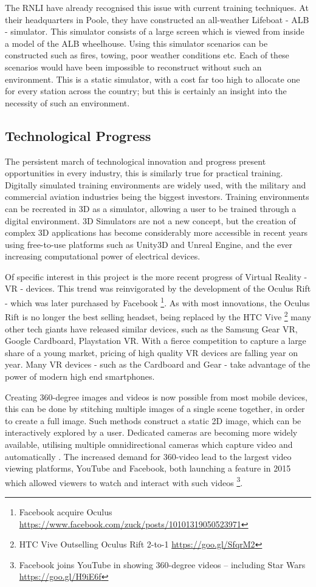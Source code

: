 \documentclass[ %
                    author={Elis Jones},
                supervisor={Dr. Kirsten Cater},
                    degree={BSc},
                     title={The Effect of Presentation Medium on Spatial Cognition},
                  subtitle={in the Virtual Environment},
                      year={2018} ]{dissertation}
\begin{document}
The RNLI have already recognised this issue with current training techniques. At their headquarters in Poole, they have constructed an all-weather Lifeboat - ALB - simulator. This simulator consists of a large screen which is viewed from inside a model of the ALB wheelhouse. Using this simulator scenarios can be constructed such as fires, towing, poor weather conditions etc. Each of these scenarios would have been impossible to reconstruct without such an environment. This is a static simulator, with a cost far too high to allocate one for every station across the country; but this is certainly an insight into the necessity of such an environment.

\subsection{Technological Progress} \label{tech_progress}
The persistent march of technological innovation and progress present opportunities in every  industry, this is similarly true for practical training. Digitally simulated training environments are widely used, with the military and commercial aviation industries being the biggest investors. Training environments can be recreated in 3D as a simulator, allowing a user to be trained through a digital environment. 3D Simulators are not a new concept, but the creation of complex 3D applications has become considerably more accessible in recent years using free-to-use platforms such as Unity3D and Unreal Engine, and the ever increasing computational power of electrical devices. 

Of specific interest in this project is the more recent progress of Virtual Reality - VR - devices. This trend was reinvigorated by the development of the Oculus Rift - which was later purchased by Facebook \footnote{Facebook acquire Oculus \url{https://www.facebook.com/zuck/posts/10101319050523971}}. As with most innovations, the Oculus Rift is no longer the best selling headset, being replaced by the HTC Vive \footnote{HTC Vive Outselling Oculus Rift 2-to-1 \url{https://goo.gl/SfqrM2}} many other tech giants have released similar devices, such as the Samsung Gear VR, Google Cardboard, Playstation VR. With a fierce competition to capture a large share of a young market, pricing of high quality VR devices are falling year on year. Many VR devices - such as the Cardboard and Gear - take advantage of the power of modern high end smartphones. 

Creating 360-degree images and videos is now possible from most mobile devices, this can be done by stitching multiple images of a single scene together, in order to create a full image. Such methods construct a static 2D image, which can be interactively explored by a user. Dedicated cameras are becoming more widely available, utilising multiple omnidirectional cameras which capture video and automatically . The increased demand for 360-video lead to the largest video viewing platforms, YouTube and Facebook, both launching a feature in 2015 which allowed viewers to watch and interact with such videos \footnote{Facebook joins YouTube in showing 360-degree videos – including Star Wars \url{https://goo.gl/H9iE6f}}. 
\end{document}
